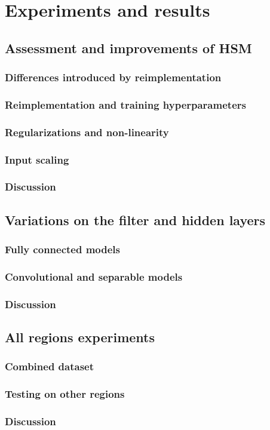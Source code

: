\chapter{Experiments and results}\label{ch:5}

\section{Assessment and improvements of HSM}

\subsection{Differences introduced by reimplementation}

\subsection{Reimplementation and training hyperparameters}

\subsection{Regularizations and non-linearity}

\subsection{Input scaling}

\subsection{Discussion}

\section{Variations on the filter and hidden layers}

\subsection{Fully connected models}

\subsection{Convolutional and separable models}

\subsection{Discussion}

\section{All regions experiments}

\subsection{Combined dataset}\label{ch:5.3.1}

\subsection{Testing on other regions}\label{ch:5.3.2}

\subsection{Discussion}
